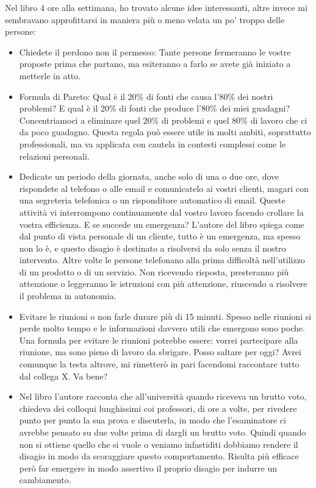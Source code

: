 \documentclass[12pt]{book} %
\begin{document}
\begin{mdframed}[linewidth=1pt]
Nel libro 4 ore alla settimana, ho trovato alcune idee interessanti, altre invece mi sembravano approfittarsi in maniera più o meno velata un po' troppo delle persone:

\begin{itemize}
\item Chiedete il perdono non il permesso: Tante persone fermeranno le vostre proposte prima che partano, ma esiteranno
a farlo se avete già iniziato a metterle in atto.
\item Formula di Pareto: Qual è il 20\% di fonti che causa l'80\% dei nostri problemi? E qual è il
20\% di fonti che produce l'80\% dei miei guadagni? Concentriamoci a eliminare quel 20\% di
problemi e quel 80\% di lavoro che ci da poco guadagno. Questa regola può essere utile in molti ambiti, soprattutto professionali, ma va applicata con cautela in contesti complessi come le relazioni personali.
\item Dedicate un periodo della giornata, anche solo di una o due ore, dove rispondete al telefono o alle email e
comunicatelo ai vostri clienti, magari con una segreteria telefonica o un risponditore automatico di email. Queste
attività vi interrompono continuamente dal vostro lavoro facendo crollare la vostra efficienza. E se succede un
emergenza? L'autore del libro spiega come dal punto di vista personale di un cliente, tutto è un
emergenza, ma spesso non lo è, e questo disagio è destinato a risolversi da solo senza il nostro intervento. Altre volte
le persone telefonano alla prima difficoltà nell'utilizzo di un prodotto o di un servizio. Non
ricevendo risposta, presteranno più attenzione o leggeranno le istruzioni con più attenzione, riuscendo a risolvere il problema in
autonomia.
\item Evitare le riunioni o non farle durare più di 15 minuti. Spesso nelle riunioni si perde molto tempo e le
informazioni davvero utili che emergono sono poche. Una formula per evitare le riunioni potrebbe essere: vorrei
partecipare alla riunione, ma sono pieno di lavoro da sbrigare. Posso saltare per oggi? Avrei comunque la testa
altrove, mi rimetterò in pari facendomi raccontare tutto dal collega X. Va bene?
\item Nel libro l'autore racconta che all'università quando riceveva un brutto voto, chiedeva dei colloqui lunghissimi
coi professori, di ore a volte, per rivedere punto per punto la sua prova e discuterla, in modo che l'esaminatore ci
avrebbe pensato su due volte prima di dargli un brutto voto. Quindi quando non si ottiene quello che si vuole o veniamo
infastiditi dobbiamo rendere il disagio in modo da scoraggiare questo comportamento. Risulta più efficace però far emergere in modo assertivo il proprio disagio per indurre un cambiamento.
\end{itemize}
\end{mdframed}
\end{document}
